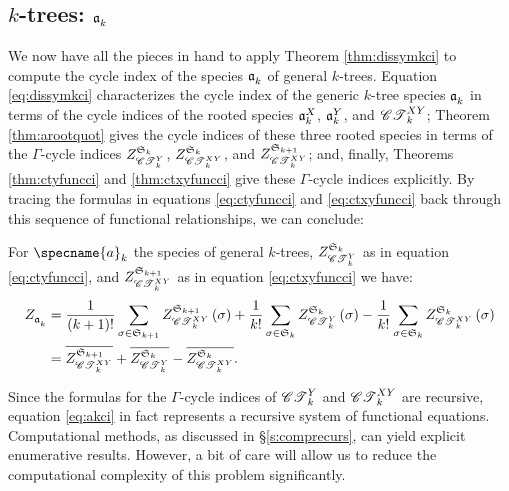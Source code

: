\documentclass[distribution,draft]{brandiss} %
\numberwithin{section}{chapter}
\numberwithin{figure}{chapter}
\begin{document}
\subsection{$k$-trees: $\kt{k}$}\label{ss:ktcycind}
We now have all the pieces in hand to apply Theorem \ref{thm:dissymkci} to compute the cycle index of the species $\kt{k}$ of general $k$-trees.
Equation \eqref{eq:dissymkci} characterizes the cycle index of the generic $k$-tree species $\kt{k}$ in terms of the cycle indices of the rooted species $\ktx{k}$, $\kty{k}$, and $\ctxy{k}$; Theorem \ref{thm:arootquot} gives the cycle indices of these three rooted species in terms of the $\Gamma$-cycle indices $\gci{\symgp{k}}{\cty{k}}$, $\gci{\symgp{k}}{\ctxy{k}}$, and $\gci{\symgp{k+1}}{\ctxy{k}}$; and, finally, Theorems \ref{thm:ctyfuncci} and \ref{thm:ctxyfuncci} give these $\Gamma$-cycle indices explicitly.
By tracing the formulas in equations \ref{eq:ctyfuncci} and \ref{eq:ctxyfuncci} back through this sequence of functional relationships, we can conclude:
\begin{theorem}
  \label{thm:akci}
  For $\specname{a}_{k}$ the species of general $k$-trees, $\gci{\symgp{k}}{\cty{k}}$ as in equation \eqref{eq:ctyfuncci}, and $\gci{\symgp{k+1}}{\ctxy{k}}$ as in equation \eqref{eq:ctxyfuncci} we have:
  \label{thm:ktreecyc}
  \begin{subequations}
    \label{eq:akci}
    \begin{align}
      \ci{\kt{k}} &= \frac{1}{\pbrac{k+1}!} \sum_{\sigma \in \symgp{k+1}} \gcielt{\symgp{k+1}}{\ctxy{k}}{\sigma} + \frac{1}{k!} \sum_{\sigma \in \symgp{k}} \gcielt{\symgp{k}}{\cty{k}}{\sigma} - \frac{1}{k!} \sum_{\sigma \in \symgp{k}} \gcielt{\symgp{k}}{\ctxy{k}}{\sigma} \label{eq:akciexplicit} \\
      &= \qgci{\symgp{k+1}}{\ctxy{k}} + \qgci{\symgp{k}}{\cty{k}} - \qgci{\symgp{k}}{\ctxy{k}}. \label{eq:akciquot}
    \end{align}
  \end{subequations}

\end{theorem}

Since the formulas for the $\Gamma$-cycle indices of $\cty{k}$ and $\ctxy{k}$ are recursive, equation \eqref{eq:akci} in fact represents a recursive system of functional equations.
Computational methods, as discussed in \S \ref{s:comprecurs}, can yield explicit enumerative results.
However, a bit of care will allow us to reduce the computational complexity of this problem significantly.
\end{document}
